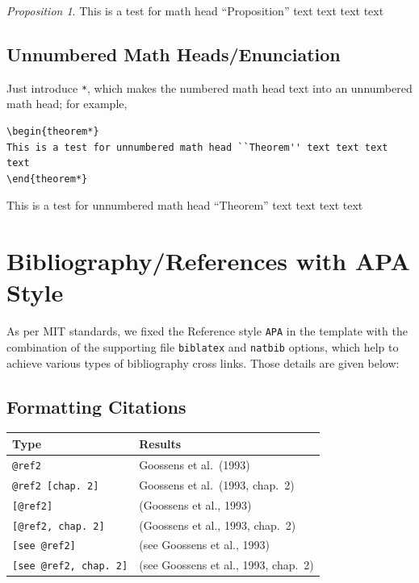 \documentclass[]{imag-ms-template}
\theoremstyle{plain}
\theoremstyle{remark}
\begin{document}
\newtheorem{proposition}{Proposition}
\begin{proposition}
This is a test for math head ``Proposition'' text text text text
\end{proposition}

\subsection{Unnumbered Math
Heads/Enunciation}\label{unnumbered-math-headsenunciation}

Just introduce \verb!*!, which makes the numbered math head text into an
unnumbered math head; for example,

\begin{verbatim}
\begin{theorem*}
This is a test for unnumbered math head ``Theorem'' text text text text
\end{theorem*}
\end{verbatim}

\begin{theorem*}
This is a test for unnumbered math head ``Theorem'' text text text text
\end{theorem*}

\section{Bibliography/References with APA
Style}\label{bibliographyreferences-with-apa-style}

As per MIT standards, we fixed the Reference style \verb!APA! in the
template with the combination of the supporting file \verb!biblatex! and
\verb!natbib! options, which help to achieve various types of
bibliography cross links. Those details are given below:

\subsection{Formatting Citations}\label{formatting-citations}

\begin{longtable}[]{@{}ll@{}}
\toprule\noalign{}
Type & Results \\
\midrule\noalign{}
\endhead
\bottomrule\noalign{}
\endlastfoot
\texttt{@ref2} & Goossens et al.~(1993) \\
\texttt{@ref2\ {[}chap.\ 2{]}} & Goossens et al.~(1993, chap.~2) \\
\texttt{{[}@ref2{]}} & (Goossens et al., 1993) \\
\texttt{{[}@ref2,\ chap.\ 2{]}} & (Goossens et al., 1993, chap.~2) \\
\texttt{{[}see\ @ref2{]}} & (see Goossens et al., 1993) \\
\texttt{{[}see\ @ref2,\ chap.\ 2{]}} & (see Goossens et al., 1993,
chap.~2) \\
\end{longtable}
\end{document}
